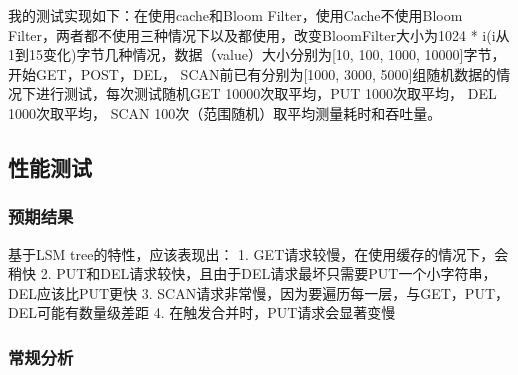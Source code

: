 \documentclass[fontset=none]{article}
\begin{document}
我的测试实现如下：在使用cache和Bloom Filter，使用Cache不使用Bloom Filter，两者都不使用三种情况下以及都使用，改变BloomFilter大小为1024 * i(i从1到15变化)字节几种情况，数据（value）大小分别为[10, 100, 1000, 10000]字节，开始GET，POST，DEL， SCAN前已有分别为[1000, 3000, 5000]组随机数据的情况下进行测试，每次测试随机GET 10000次取平均，PUT 1000次取平均， DEL 1000次取平均， SCAN 100次（范围随机）取平均测量耗时和吞吐量。
\subsection{性能测试}


\subsubsection{预期结果}
基于LSM tree的特性，应该表现出：
1. GET请求较慢，在使用缓存的情况下，会稍快
2. PUT和DEL请求较快，且由于DEL请求最坏只需要PUT一个小字符串，DEL应该比PUT更快
3. SCAN请求非常慢，因为要遍历每一层，与GET，PUT，DEL可能有数量级差距
4. 在触发合并时，PUT请求会显著变慢
\subsubsection{常规分析}
\end{document}
